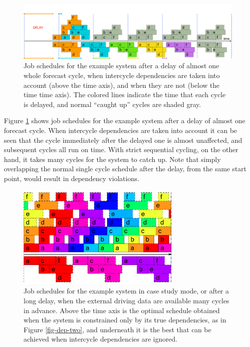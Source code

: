 \documentclass[11pt,a4paper]{article}
\begin{document}
\begin{figure} 
    \begin{center} 
        \includegraphics[width=12cm]{timeline-three}
    \end{center} 
    \caption{\small Job schedules for the example system after a 
    delay of almost one whole forecast cycle, when intercycle
    dependencies are taken into account (above the time axis), and when
    they are not (below the time time axis). The colored lines indicate
    the time that each cycle is delayed, and normal ``caught up'' cycles
    are shaded gray.} 
    \label{fig-time-three}
\end{figure} 

Figure \ref{fig-time-three} shows job schedules for the example system
after a delay of almost one forecast cycle. When intercycle dependencies
are taken into account it can be seen that the cycle immediately after
the delayed one is almost unaffected, and subsequent cycles all run on
time. With strict sequential cycling, on the other hand, it
takes many cycles for the system to catch up. Note that simply
overlapping the normal single cycle schedule after the delay, from the
same start point, would result in dependency violations.

\begin{figure} 
    \begin{center} 
        \includegraphics[width=8cm]{timeline-two}
    \end{center} 
    \caption{\small Job schedules for the example system in case study
    mode, or after a long delay, when the external driving data are
    available many cycles in advance. Above the time axis is the optimal
    schedule obtained when the system is constrained only by its true
    dependencies, as in Figure \ref{fig-dep-two}, and underneath it is
    the best that can be achieved when intercycle dependencies are
    ignored.} 
    \label{fig-time-two}
\end{figure} 
\end{document}
